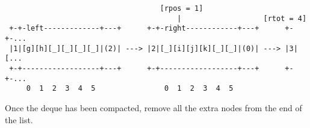 \begin{enumerate}
	      \begin{verbatim}
                                    [rpos = 1]                        				
                                        |                   [rtot = 4]
 +-+-left-------------+---+      +-+-right------------+---+      +-+-... 
 |1|[g][h][_][_][_][_]|(2)| ---> |2|[_][i][j][k][_][_]|(0)| ---> |3|[...
 +-+------------------+---+      +-+------------------+---+      +-+-...
     0  1  2  3  4  5                0  1  2  3  4  5                 
				\end{verbatim}


\end{enumerate}

Once the deque has been compacted, remove all the extra nodes from the
end of the list.

